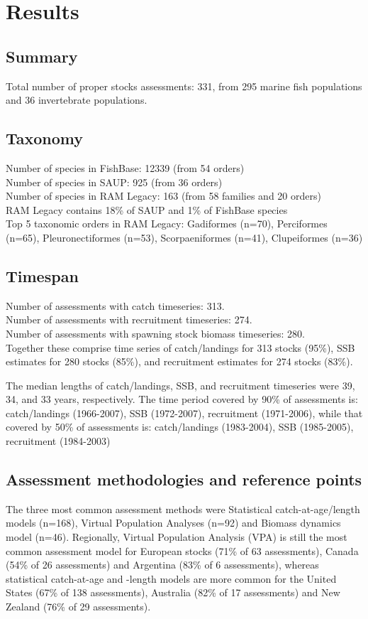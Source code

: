 \section*{Results}
\subsection*{Summary}
\noindent
Total number of proper stocks assessments: 331, from 295 marine fish populations and 36
invertebrate populations.

\subsection*{Taxonomy}
\noindent

Number of species in FishBase: 12339 (from 54 orders) \\
Number of species in SAUP: 925 (from 36 orders)\\
Number of species in RAM Legacy: 163 (from 58 families and 20 orders) \\
RAM Legacy contains 18\% of SAUP and 1\% of FishBase species\\
Top 5 taxonomic orders in RAM Legacy: Gadiformes (n=70), Perciformes (n=65), Pleuronectiformes (n=53), Scorpaeniformes (n=41), Clupeiformes (n=36) \\

\subsection*{Timespan}
\noindent
Number of assessments with catch timeseries: 313.\\
Number of assessments with recruitment timeseries: 274.\\
Number of assessments with spawning stock biomass timeseries: 280.\\

Together these comprise time series of
catch/landings for 313 stocks (95\%),
SSB estimates for 280 stocks (85\%), and recruitment estimates for
274 stocks (83\%).

The median lengths of catch/landings, SSB, and recruitment timeseries
were 39, 34, and 33
years, respectively.  The time period covered by 90\% of assessments
is: catch/landings (1966-2007), SSB
(1972-2007), recruitment (1971-2006), while that
covered by 50\% of assessments is: catch/landings
(1983-2004), SSB (1985-2005), recruitment
(1984-2003)
 
\subsection*{Assessment methodologies and reference points}
\noindent
The three most common assessment methods were
Statistical catch-at-age/length models (n=168), Virtual Population Analyses (n=92) and
Biomass dynamics model (n=46). Regionally, Virtual Population Analysis
(VPA) is still the most common assessment model for European stocks
(71\% of 63 assessments),
Canada (54\% of 26
assessments) and Argentina (83\% of
6 assessments), whereas statistical catch-at-age
and -length models are more common for the United States
(67\% of 138 assessments),
Australia (82\% of 17
assessments) and New Zealand (76\% of
29 assessments).

